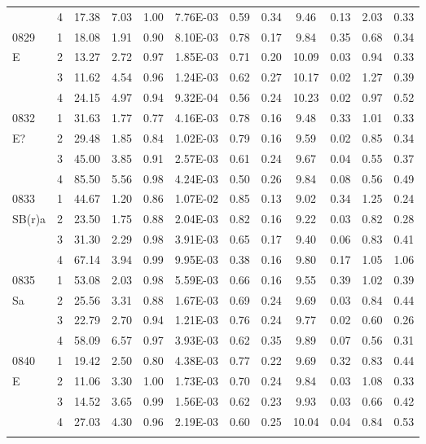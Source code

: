 \begin{center}
\begin{longtable}{lccccccccccc}
	&	4	&	17.38	&	7.03	&	1.00	&	7.76E-03	&	0.59	&	0.34	&	9.46	&	0.13	&	2.03	&	0.33	\\
0829	&	1	&	18.08	&	1.91	&	0.90	&	8.10E-03	&	0.78	&	0.17	&	9.84	&	0.35	&	0.68	&	0.34	\\
E 	&	2	&	13.27	&	2.72	&	0.97	&	1.85E-03	&	0.71	&	0.20	&	10.09	&	0.03	&	0.94	&	0.33	\\
	&	3	&	11.62	&	4.54	&	0.96	&	1.24E-03	&	0.62	&	0.27	&	10.17	&	0.02	&	1.27	&	0.39	\\
	&	4	&	24.15	&	4.97	&	0.94	&	9.32E-04	&	0.56	&	0.24	&	10.23	&	0.02	&	0.97	&	0.52	\\
0832	&	1	&	31.63	&	1.77	&	0.77	&	4.16E-03	&	0.78	&	0.16	&	9.48	&	0.33	&	1.01	&	0.33	\\
E?	&	2	&	29.48	&	1.85	&	0.84	&	1.02E-03	&	0.79	&	0.16	&	9.59	&	0.02	&	0.85	&	0.34	\\
	&	3	&	45.00	&	3.85	&	0.91	&	2.57E-03	&	0.61	&	0.24	&	9.67	&	0.04	&	0.55	&	0.37	\\
	&	4	&	85.50	&	5.56	&	0.98	&	4.24E-03	&	0.50	&	0.26	&	9.84	&	0.08	&	0.56	&	0.49	\\
0833	&	1	&	44.67	&	1.20	&	0.86	&	1.07E-02	&	0.85	&	0.13	&	9.02	&	0.34	&	1.25	&	0.24	\\
SB(r)a	&	2	&	23.50	&	1.75	&	0.88	&	2.04E-03	&	0.82	&	0.16	&	9.22	&	0.03	&	0.82	&	0.28	\\
	&	3	&	31.30	&	2.29	&	0.98	&	3.91E-03	&	0.65	&	0.17	&	9.40	&	0.06	&	0.83	&	0.41	\\
	&	4	&	67.14	&	3.94	&	0.99	&	9.95E-03	&	0.38	&	0.16	&	9.80	&	0.17	&	1.05	&	1.06	\\
0835	&	1	&	53.08	&	2.03	&	0.98	&	5.59E-03	&	0.66	&	0.16	&	9.55	&	0.39	&	1.02	&	0.39	\\
Sa	&	2	&	25.56	&	3.31	&	0.88	&	1.67E-03	&	0.69	&	0.24	&	9.69	&	0.03	&	0.84	&	0.44	\\
	&	3	&	22.79	&	2.70	&	0.94	&	1.21E-03	&	0.76	&	0.24	&	9.77	&	0.02	&	0.60	&	0.26	\\
	&	4	&	58.09	&	6.57	&	0.97	&	3.93E-03	&	0.62	&	0.35	&	9.89	&	0.07	&	0.56	&	0.31	\\
0840	&	1	&	19.42	&	2.50	&	0.80	&	4.38E-03	&	0.77	&	0.22	&	9.69	&	0.32	&	0.83	&	0.44	\\
E 	&	2	&	11.06	&	3.30	&	1.00	&	1.73E-03	&	0.70	&	0.24	&	9.84	&	0.03	&	1.08	&	0.33	\\
	&	3	&	14.52	&	3.65	&	0.99	&	1.56E-03	&	0.62	&	0.23	&	9.93	&	0.03	&	0.66	&	0.42	\\
	&	4	&	27.03	&	4.30	&	0.96	&	2.19E-03	&	0.60	&	0.25	&	10.04	&	0.04	&	0.84	&	0.53	\\


\label{table_properties}
\end{longtable}
\end{center}

